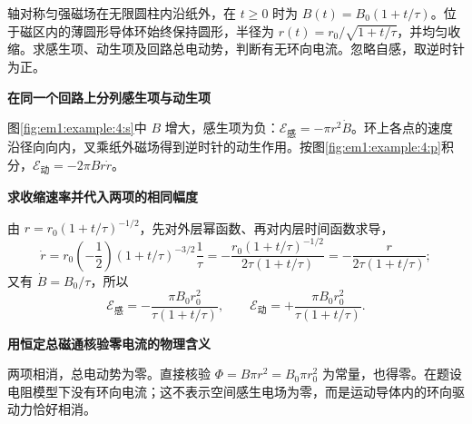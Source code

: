 \begin{question}\begin{example}[同一回路中场变与运动的抵消]\label{em1:example:4}
轴对称匀强磁场在无限圆柱内沿纸外，在 $t\ge0$ 时为 $B(t)=B_0(1+t/\tau)$。位于磁区内的薄圆形导体环始终保持圆形，半径为 $r(t)=r_0/\sqrt{1+t/\tau}$，并均匀收缩。求感生项、动生项及回路总电动势，判断有无环向电流。忽略自感，取逆时针为正。
\end{example}
\end{question}
\begin{solution}\textbf{在同一个回路上分列感生项与动生项}\par\nobreak
图\ref{fig:em1:example:4:s}中 $B$ 增大，感生项为负：$\mathcal E_{\text{感}}=-\pi r^2\dot B$。环上各点的速度沿径向向内，叉乘纸外磁场得到逆时针的动生作用。按图\ref{fig:em1:example:4:p}积分，$\mathcal E_{\text{动}}=-2\pi Br\dot r$。



\par\medskip{}\noindent\textbf{求收缩速率并代入两项的相同幅度}\par\nobreak
由 $r=r_0(1+t/\tau)^{-1/2}$，先对外层幂函数、再对内层时间函数求导，
\[
\dot r=r_0\left(-\frac12\right)(1+t/\tau)^{-3/2}\frac1\tau
=-\frac{r_0(1+t/\tau)^{-1/2}}{2\tau(1+t/\tau)}
=-\frac{r}{2\tau(1+t/\tau)};
\]又有 $\dot B=B_0/\tau$，所以
\[\mathcal E_{\text{感}}=-\frac{\pi B_0r_0^2}{\tau(1+t/\tau)},\qquad
\mathcal E_{\text{动}}=+\frac{\pi B_0r_0^2}{\tau(1+t/\tau)}.\]




\par\medskip{}\noindent\textbf{用恒定总磁通核验零电流的物理含义}\par\nobreak
两项相消，总电动势为零。直接核验 $\Phi=B\pi r^2=B_0\pi r_0^2$ 为常量，也得零。在题设电阻模型下没有环向电流；这不表示空间感生电场为零，而是运动导体内的环向驱动力恰好相消。\end{solution}
